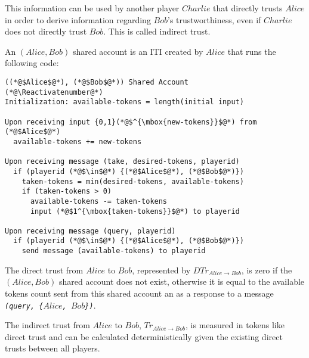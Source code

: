   This information can be used by another player $Charlie$ that directly trusts $Alice$ in order to derive information
  regarding $Bob$'s trustworthiness, even if $Charlie$ does not directly trust $Bob$. This is called indirect trust.

  \begin{definition}
    An $\left(Alice, Bob\right)$ shared account is an ITI created by $Alice$ that runs the following code:
  \end{definition}
  \Suppressnumber
  \begin{lstlisting}[label=sharedaccount, style=numbers]
((*@$Alice$@*), (*@$Bob$@*)) Shared Account
(*@\Reactivatenumber@*)
Initialization: available-tokens = length(initial input)

Upon receiving input {0,1}(*@$^{\mbox{new-tokens}}$@*) from (*@$Alice$@*)
  available-tokens += new-tokens

Upon receiving message (take, desired-tokens, playerid)
  if (playerid (*@$\in$@*) {(*@$Alice$@*), (*@$Bob$@*)})
    taken-tokens = min(desired-tokens, available-tokens)
    if (taken-tokens > 0)
      available-tokens -= taken-tokens
      input (*@$1^{\mbox{taken-tokens}}$@*) to playerid

Upon receiving message (query, playerid)
  if (playerid (*@$\in$@*) {(*@$Alice$@*), (*@$Bob$@*)})
    send message (available-tokens) to playerid
  \end{lstlisting}
  \begin{definition}
    The direct trust from $Alice$ to $Bob$, represented by $DTr_{Alice \rightarrow Bob}$, is zero if the $\left(Alice,
    Bob\right)$ shared account does not exist, otherwise it is equal to the available tokens count sent from this shared
    account an as a response to a message \emph{\texttt{(query, \{}$Alice$\texttt{, }$Bob$\texttt{\})}}.
  \end{definition}

  \begin{definition}
    The indirect trust from $Alice$ to $Bob$, $Tr_{Alice \rightarrow Bob}$, is measured in tokens like direct trust and can be
    calculated deterministically given the existing direct trusts between all players.
  \end{definition}

